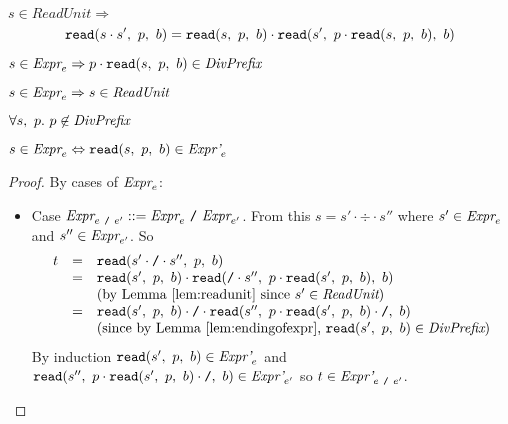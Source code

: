 \documentclass[preprint,10pt]{sigplanconf}
\begin{document}
\begin{lemma}\mbox{}

  \( s \in \textit{ReadUnit} \Rightarrow \)
\[
  \texttt{read}(s\cdot s',~p,~b) = 
  \texttt{read}(s,~p,~b) \cdot \texttt{read}(s',~p \cdot \texttt{read}(s,~p,~b),~b)
\] 
\end{lemma}

\begin{lemma}\mbox{}

  \( s \in \textit{Expr}_{e} \Rightarrow p \cdot \texttt{read}(s,~p,~b) \in \textit{DivPrefix} \)
\end{lemma}

\begin{lemma}
  \( s \in \textit{Expr}_{e} \Rightarrow s \in \textit{ReadUnit} \)
\end{lemma}

\begin{lemma}\mbox{}
  
  \( \forall s,~p. ~p \not \in \textit{DivPrefix} \)

  \( s \in \textit{Expr}_{e} \Leftrightarrow \texttt{read}(s,~p,~b) \in \textit{Expr'}_{e} \)
\end{lemma}
\begin{proof}
  
  By cases of \( \textit{Expr}_{e} \):

  \begin{itemize}

  \item Case \(\textit{Expr}_{e~\texttt{/}~e'} ::= \textit{Expr}_{e} ~\texttt{/}~ \textit{Expr}_{e'} \).
    From this \( s = s' \cdot \div \cdot s'' \) where \( s' \in
    \textit{Expr}_{e} \) and \( s'' \in \textit{Expr}_{e'} \). So
    \[
    \begin{array}{rcl}
      t &=& \texttt{read}(s' \cdot \texttt{/} \cdot s'',~p,~b)
      \\
      &=& \texttt{read}(s',~p,~b) \cdot \texttt{read}(\texttt{/} \cdot s'',~
        p\cdot \texttt{read}(s',~p,~b)
      ,~b)
      \\
      &&\textrm{(by Lemma \ref{lem:readunit} since \( s' \in \textit{ReadUnit} \))}
      \\
      &=& \texttt{read}(s',~p,~b) \cdot \texttt{/} \cdot 
      \texttt{read}(s'',~
        p\cdot \texttt{read}(s',~p,~b) \cdot \texttt{/}
      ,~b)
      \\
      &&\textrm{(since by Lemma \ref{lem:endingofexpr}, \(
        \texttt{read}(s',~p,~b) \in \textit{DivPrefix}\))}
      \\
    \end{array}
    \]
    By induction \( \texttt{read}(s',~p,~b) \in \textit{Expr'}_{e} \) and
    \( 
      \texttt{read}(s'',~
        p\cdot \texttt{read}(s',~p,~b) \cdot \texttt{/}
      ,~b) \in \textit{Expr'}_{e'}
      \) so \( t \in \textit{Expr'}_{e ~\texttt{/}~ e'} \).

  \end{itemize}
\end{proof}
\end{document}
